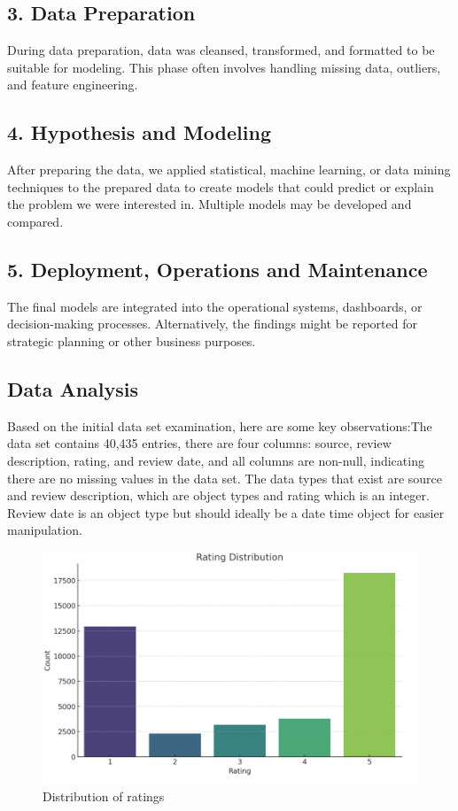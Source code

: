 \documentclass[
	a4paper, %
	10pt, %
	unnumberedsections, %
	twoside, %
]{LTJournalArticle}
\begin{document}
\subsection{3. Data Preparation}
During data preparation, data was cleansed, transformed, and formatted to be suitable for modeling. This phase often involves handling missing data, outliers, and feature engineering.
\subsection{4. Hypothesis and Modeling}
After preparing the data, we applied statistical, machine learning, or data mining techniques to the prepared data to create models that could predict or explain the problem we were interested in. Multiple models may be developed and compared.
\subsection{5. Deployment, Operations and Maintenance}
The final models are integrated into the operational systems, dashboards, or decision-making processes. Alternatively, the findings might be reported for strategic planning or other business purposes.

\subsection{Data Analysis}

Based on the initial data set examination, here are some key observations:The data set contains 40,435 entries, there are four columns: source, review description, rating, and review date, and all columns are non-null, indicating there are no missing values in the data set. The data types that exist are source and review description, which are object types and rating which is an integer. Review date is an object type but should ideally be a date time object for easier manipulation.
\begin{figure}
    \centering
    \includegraphics[width=1\linewidth]{Figures/Rating_distribution.png}
    \caption{Distribution of ratings}
    \label{fig:1}
\end{figure}
\end{document}
